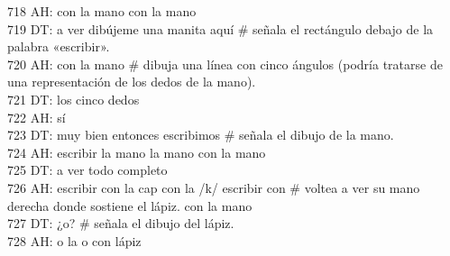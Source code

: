 718 AH: con la mano con la mano\\
719 DT: a ver dibújeme una manita aquí \# señala el rectángulo debajo de la palabra «escribir».\\
720 AH: con la mano \# dibuja una línea con cinco ángulos (podría tratarse de una representación de los dedos de la mano).\\
721 DT: los cinco dedos\\
722 AH: sí\\
723 DT: muy bien entonces escribimos \# señala el dibujo de la mano.\\
724 AH: escribir la mano la mano con la mano\\
725 DT: a ver todo completo\\
726 AH: escribir con la cap con la /k/ escribir con \# voltea a ver su mano derecha donde sostiene el lápiz. con la mano\\
727 DT: ¿o? \# señala el dibujo del lápiz.\\
728 AH: o la o con lápiz\\
